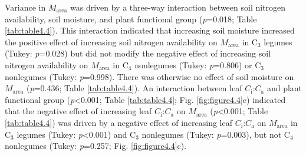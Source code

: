 Variance in $M_\mathrm{area}$ was driven by a three-way interaction between soil nitrogen availability, soil moisture, and plant functional group (\textit{p}=0.018; Table \ref{tab:table4.4}). This interaction indicated that increasing soil moisture increased the positive effect of increasing soil nitrogen availability on $M_\mathrm{area}$ in C$_3$ legumes (Tukey: \textit{p}=0.028) but did not modify the negative effect of increasing soil nitrogen availability on $M_\mathrm{area}$ in C$_4$ nonlegumes (Tukey: \textit{p}=0.806) or C$_3$ nonlegumes (Tukey: \textit{p}=0.998). There was otherwise no effect of soil moisture on $M_\mathrm{area}$ (\textit{p}=0.436; Table \ref{tab:table4.4}). An interaction between leaf $C_\mathrm{i}$:$C_\mathrm{a}$ and plant functional group (\textit{p}<0.001; Table \ref{tab:table4.4}; Fig. \ref{fig:figure4.4}c) indicated that the negative effect of increasing leaf $C_\mathrm{i}$:$C_\mathrm{a}$ on $M_\mathrm{area}$ (\textit{p}<0.001; Table \ref{tab:table4.4}) was driven by a negative effect of increasing leaf $C_\mathrm{i}$:$C_\mathrm{a}$ on $M_\mathrm{area}$ in C$_3$ legumes (Tukey: \textit{p}<0.001) and C$_3$ nonlegumes (Tukey: \textit{p}=0.003), but not C$_4$ nonlegumes (Tukey: \textit{p}=0.257; Fig. \ref{fig:figure4.4}c).

